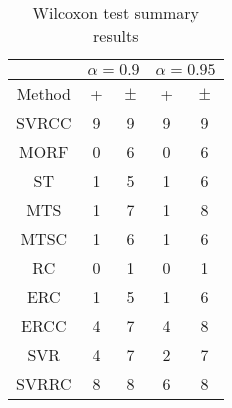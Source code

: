 \documentclass[a4paper,10pt]{article}
\begin{document}
\begin{table}[!htp]
\centering\scriptsize
\begin{tabular}{
|c|c|c|c|c|}
\hline
&\multicolumn{2}{c|}{$\alpha=0.9$} & \multicolumn{2}{c|}{$\alpha=0.95$}\\\hline
Method & + & $\pm$ & + & $\pm$ \\
\hline
SVRCC & 9 & 9 & 9 & 9\\
\hline
MORF & 0 & 6 & 0 & 6\\
\hline
ST & 1 & 5 & 1 & 6\\
\hline
MTS & 1 & 7 & 1 & 8\\
\hline
MTSC & 1 & 6 & 1 & 6\\
\hline
RC & 0 & 1 & 0 & 1\\
\hline
ERC & 1 & 5 & 1 & 6\\
\hline
ERCC & 4 & 7 & 4 & 8\\
\hline
SVR & 4 & 7 & 2 & 7\\
\hline
SVRRC & 8 & 8 & 6 & 8\\
\hline

\end{tabular}
\caption{Wilcoxon test summary results}

\end{table}

 \clearpage 
\end{document}
